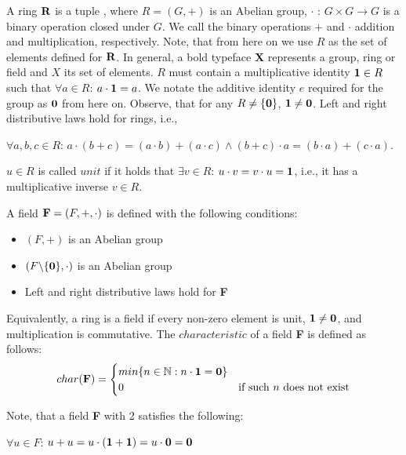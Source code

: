 A ring $\textbf R$ is a tuple
,
where $R = (G, +)$ is an Abelian group, $\cdot$ : $G \times G \longrightarrow G$ 
is a binary operation closed under $G$. We call the binary operations $+$ and
$\cdot$
addition and multiplication, respectively. 
Note, that from here on we use $R$ as the set of elements defined for $\textbf R$. 
In general, a bold typeface \textbf X represents a group, ring or field and $X$ its set of elements. 
$R$ must contain a multiplicative identity $\textbf 1 \in R$ such that $\forall a \in R$: $a \cdot \textbf 1 = a$. 
We notate the additive identity $e$ required for the group as $\textbf 0$ from here on. 
Observe, that for any $R \neq \{\textbf 0\}$, $\textbf 1 \neq \textbf 0$.  
Left and right distributive laws hold for rings, i.e., 
\begin{center}
  $\forall a, b, c \in R$: $a \cdot (b + c) = (a \cdot b) + (a \cdot c) \land (b + c) \cdot a = (b \cdot a) + (c \cdot a)$.
\end{center}
$u \in R$ is called $unit$ if it holds that $\exists v \in R$: $u \cdot v = v \cdot u = \textbf 1$, 
i.e., it has a multiplicative inverse $v \in R$.

A field $\textbf F = (F, +, \cdot)$ is defined with the following conditions:
\begin{itemize}
  \item $(F, +)$ is an Abelian group
  \item $(F\backslash \{\textbf 0\}, \cdot )$ is an Abelian group
  \item Left and right distributive laws hold for \textbf F
\end{itemize}

Equivalently, a ring is a field if every non-zero element is unit, $\textbf 1 \neq \textbf 0$, and multiplication is commutative. 
The $characteristic$ of a field \textbf F is defined as follows:
  \begin{equation}
    char(\textbf F) =
      \begin{cases}
        min\{n \in \mathbb N : n \cdot \textbf 1 = \textbf 0 \}\\
        0 & \text{if such $n$ does not exist}\\
      \end{cases}       
  \end{equation}

Note, that a field \textbf F with
 2 satisfies the following:
\begin{center}
  $\forall u \in F$: $u + u = u \cdot (\textbf 1 + \textbf 1) = u \cdot \textbf 0 = \textbf 0$
\end{center}

